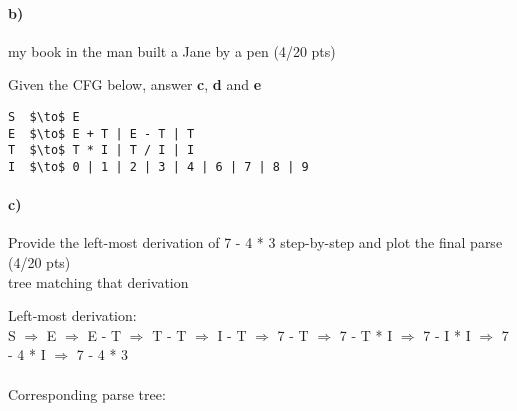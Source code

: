 \documentclass[a4paper,12pt]{article}
\begin{document}
\paragraph{b)} my book in the man built a Jane by a pen \hfill \small{(4/20 pts)} \\
\begin{tcolorbox}

\end{tcolorbox}
\newpage

Given the CFG below, answer \textbf{c}, \textbf{d} and \textbf{e} \\

\begin{lstlisting}[style=output,mathescape=true]
S  $\to$ E
E  $\to$ E + T | E - T | T
T  $\to$ T * I | T / I | I
I  $\to$ 0 | 1 | 2 | 3 | 4 | 6 | 7 | 8 | 9
\end{lstlisting}

\paragraph{c)} Provide the left-most derivation of 7 - 4 * 3 step-by-step and plot the final parse \hfill \small{(4/20 pts)} \\
tree matching that derivation \\
\begin{tcolorbox}
Left-most derivation:\\
S $\Rightarrow$ E $\Rightarrow$ E - T $\Rightarrow$ T - T $\Rightarrow$ I - T $\Rightarrow$ 7 - T $\Rightarrow$ 7 - T * I $\Rightarrow$ 7 - I * I $\Rightarrow$ 7 - 4 * I $\Rightarrow$ 7 - 4 * 3 \\\\
Corresponding parse tree:\\
\end{tcolorbox}
\end{document}

